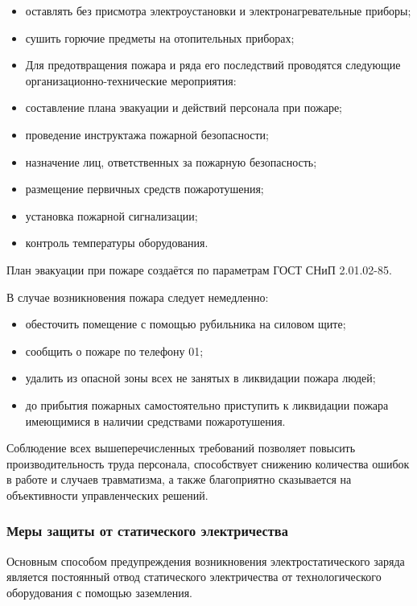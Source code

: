 \begin{itemize}
 \item оставлять без присмотра электроустановки и электронагревательные приборы;
 \item сушить горючие предметы на отопительных приборах;
 \item Для предотвращения пожара и ряда его последствий проводятся следующие организационно-технические мероприятия:
 \item составление плана эвакуации и действий персонала при пожаре;
 \item проведение инструктажа пожарной безопасности;
 \item назначение лиц, ответственных за пожарную безопасность;
 \item размещение первичных средств пожаротушения;
 \item установка пожарной сигнализации;
 \item контроль температуры оборудования.
\end{itemize}

План эвакуации при пожаре создаётся по параметрам ГОСТ СНиП 2.01.02-85\cite{OT7}.

В случае возникновения пожара следует немедленно:

\begin{itemize}
 \item обесточить помещение с помощью рубильника на силовом щите;
 \item сообщить о пожаре по телефону 01;
 \item удалить из опасной зоны всех не занятых в ликвидации пожара людей;
 \item до прибытия пожарных самостоятельно приступить к ликвидации пожара имеющимися в наличии средствами пожаротушения.
\end{itemize}

Соблюдение всех вышеперечисленных требований позволяет повысить производительность труда персонала, способствует снижению количества ошибок в работе и случаев травматизма, а также благоприятно сказывается на объективности управленческих решений.

\subsubsection{Меры защиты от статического электричества}

Основным способом предупреждения возникновения электростатического заряда является постоянный отвод статического электричества от технологического оборудования с помощью заземления. 

